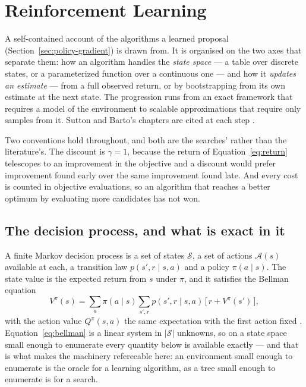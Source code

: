 \documentclass[11pt,a4paper]{article}
\begin{document}
\section{Reinforcement Learning}
\label{app:rl}

A self-contained account of the algorithms a learned proposal
(Section~\ref{sec:policy-gradient}) is drawn from. It is organised on the two
axes that separate them: how an algorithm handles the \emph{state space} ---
a table over discrete states, or a parameterized function over a continuous
one --- and how it \emph{updates an estimate} --- from a full observed return,
or by bootstrapping from its own estimate at the next state. The progression
runs from an exact framework that requires a model of the environment to
scalable approximations that require only samples from it.
Sutton and Barto's chapters are cited at each step \citep{suttonbarto2018}.

Two conventions hold throughout, and both are the searches' rather than the
literature's. The discount is $\gamma = 1$, because the return of
Equation~\ref{eq:return} telescopes to an improvement in the objective and a
discount would prefer improvement found early over the same improvement found
late. And every cost is counted in objective evaluations, so an algorithm that
reaches a better optimum by evaluating more candidates has not won.

\subsection{The decision process, and what is exact in it}
\label{app:rl:mdp}

A finite Markov decision process is a set of states $\mathcal{S}$, a set of
actions $\mathcal{A}(s)$ available at each, a transition law
$p(s' , r \mid s, a)$ and a policy $\pi(a \mid s)$. The state value is the
expected return from $s$ under $\pi$, and it satisfies the Bellman equation
\begin{equation}
  V^{\pi}(s) = \sum_{a} \pi(a \mid s) \sum_{s', r}
    p(s', r \mid s, a)\,\big[\, r + V^{\pi}(s') \,\big],
  \label{eq:bellman}
\end{equation}
with the action value $Q^{\pi}(s, a)$ the same expectation with the first
action fixed \citep[Ch.~3]{suttonbarto2018}. Equation~\ref{eq:bellman} is a
linear system in $|\mathcal{S}|$ unknowns, so on a state space small enough to
enumerate every quantity below is available exactly --- and that is what makes
the machinery refereeable here: an environment small enough to enumerate is the
oracle for a learning algorithm, as a tree small enough to enumerate is for a
search.
\end{document}
